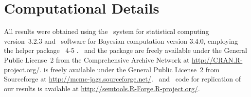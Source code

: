 \section*{Computational Details}

All results were obtained using the ~system for statistical computing \cite{Rprog}  version~3.2.3 and ~software for Bayesian computation version 3.4.0, employing the helper package ~4-5 \cite{plu14}. ~and the package  are freely available under the General Public License~2 from the Comprehensive  Archive Network at \url{http://CRAN.R-project.org/}.  is freely available under the General Public License~2 from Sourceforge at \url{http://mcmc-jags.sourceforge.net/}.   ~and ~code for replication of our results is available at \url{http://semtools.R-Forge.R-project.org/}.



